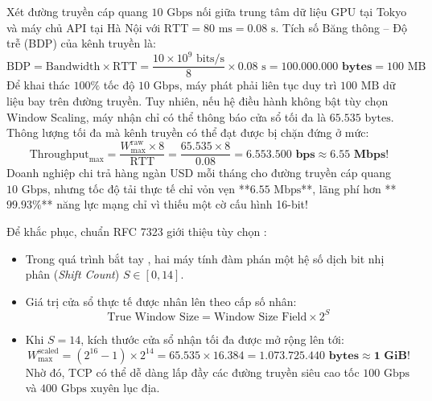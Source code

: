 \begin{example}
Xét đường truyền cáp quang $10\text{ Gbps}$ nối giữa trung tâm dữ liệu GPU tại Tokyo và máy chủ API tại Hà Nội với $\text{RTT} = 80\text{ ms} = 0.08\text{ s}$.
Tích số Băng thông -- Độ trễ (BDP) của kênh truyền là:
\begin{equation}
\text{BDP} = \text{Bandwidth} \times \text{RTT} = \frac{10 \times 10^9 \text{ bits/s}}{8} \times 0.08 \text{ s} = \mathbf{100.000.000 \text{ bytes}} = 100 \text{ MB}
\end{equation}
Để khai thác $100\%$ tốc độ $10\text{ Gbps}$, máy phát phải liên tục duy trì $100\text{ MB}$ dữ liệu bay trên đường truyền.
Tuy nhiên, nếu hệ điều hành không bật tùy chọn Window Scaling, máy nhận chỉ có thể thông báo cửa sổ tối đa là $65.535\text{ bytes}$.
Thông lượng tối đa mà kênh truyền có thể đạt được bị chặn đứng ở mức:
\begin{equation}
\text{Throughput}_{\max} = \frac{W_{\max}^{\text{raw}} \times 8}{\text{RTT}} = \frac{65.535 \times 8}{0.08} = \mathbf{6.553.500 \text{ bps}} \approx \mathbf{6.55 \text{ Mbps}}!
\end{equation}
Doanh nghiệp chi trả hàng ngàn USD mỗi tháng cho đường truyền cáp quang $10\text{ Gbps}$, nhưng tốc độ tải thực tế chỉ vỏn vẹn **$6.55\text{ Mbps}$**, lãng phí hơn **$99.93\%$** năng lực mạng chỉ vì thiếu một cờ cấu hình 16-bit!
\end{example}

Để khắc phục, chuẩn RFC 7323 giới thiệu tùy chọn :
\begin{itemize}
  \item Trong quá trình bắt tay , hai máy tính đàm phán một hệ số dịch bit nhị phân (\textit{Shift Count}) $S \in [0, 14]$.
  \item Giá trị cửa sổ thực tế được nhân lên theo cấp số nhân:
  \begin{equation}
  \text{True Window Size} = \text{Window Size Field} \times 2^S
  \end{equation}
  \item Khi $S = 14$, kích thước cửa sổ nhận tối đa được mở rộng lên tới:
  \begin{equation}
  W_{\max}^{\text{scaled}} = (2^{16} - 1) \times 2^{14} = 65.535 \times 16.384 = \mathbf{1.073.725.440 \text{ bytes}} \approx \mathbf{1 \text{ GiB}}!
  \end{equation}
  Nhờ đó, TCP có thể dễ dàng lấp đầy các đường truyền siêu cao tốc $100\text{ Gbps}$ và $400\text{ Gbps}$ xuyên lục địa.
\end{itemize}

